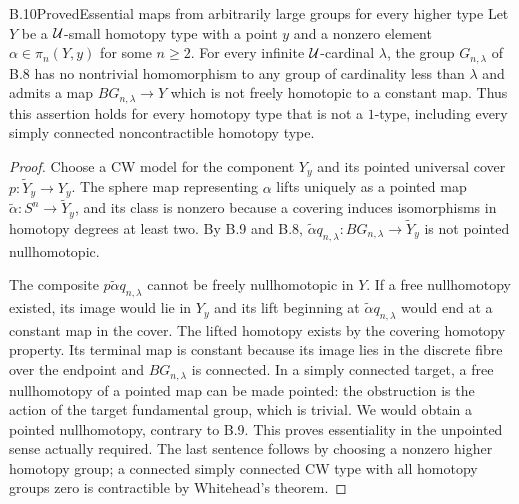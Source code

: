 \begin{claim}{B.10}{Proved}{Essential maps from arbitrarily large groups for every higher type}
Let $Y$ be a $\mathcal U$-small homotopy type with a point $y$ and a nonzero
element $\alpha\in\pi_n(Y,y)$ for some $n\geq2$.  For every infinite
$\mathcal U$-cardinal $\lambda$, the group $G_{n,\lambda}$ of B.8 has no
nontrivial homomorphism to any group of cardinality less than $\lambda$
and admits a map $BG_{n,\lambda}\to Y$ which is not freely homotopic to
a constant map.  Thus this assertion holds for every homotopy type that
is not a $1$-type, including every simply connected noncontractible
homotopy type.
\end{claim}
\begin{proof}
Choose a CW model for the component $Y_y$ and its pointed universal
cover $p:\widetilde Y_y\to Y_y$.  The sphere map representing $\alpha$
lifts uniquely as a pointed map
$\widetilde\alpha:S^n\to\widetilde Y_y$, and its class is nonzero
because a covering induces isomorphisms in homotopy degrees at least
two.  By B.9 and B.8,
$\widetilde\alpha q_{n,\lambda}:BG_{n,\lambda}\to\widetilde Y_y$
is not pointed nullhomotopic.

The composite $p\widetilde\alpha q_{n,\lambda}$ cannot be freely
nullhomotopic in $Y$.  If a free nullhomotopy existed, its image would
lie in $Y_y$ and its lift beginning at
$\widetilde\alpha q_{n,\lambda}$ would end at a constant map in the
cover.  The lifted homotopy exists by the covering homotopy property.
Its terminal map is constant because its image lies in the discrete
fibre over the endpoint and $BG_{n,\lambda}$ is connected.  In a
simply connected target, a free nullhomotopy of a pointed map can be
made pointed: the obstruction is the action of the target fundamental
group, which is trivial.  We would obtain a pointed nullhomotopy,
contrary to B.9.  This proves essentiality in the unpointed sense
actually required.  The last sentence follows by choosing a nonzero
higher homotopy group; a connected simply connected CW type with all
homotopy groups zero is contractible by Whitehead's theorem.
\end{proof}

